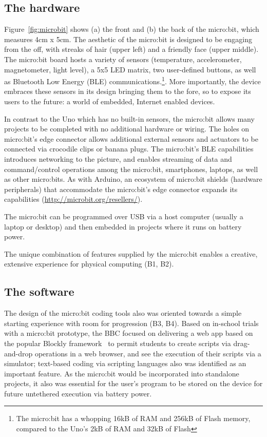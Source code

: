 \subsection{The hardware}

Figure~\ref{fig:microbit} shows (a) the front and (b) the back of the
micro:bit, which measures 4cm x 5cm. The aesthetic of the micro:bit is designed to be engaging from the off, with streaks of hair (upper left) and a friendly face (upper middle).
The micro:bit board hosts a variety of sensors (temperature, accelerometer, magnetometer,
light level), a 5x5 LED matrix, two user-defined buttons, as well as Bluetooth
Low Energy (BLE) communications.\footnote{The micro:bit has a whopping
16kB of RAM and 256kB of Flash memory, compared to the Uno's 2kB of
RAM and 32kB of Flash}. More importantly, the device embraces these sensors in its design bringing them to the fore, so to expose its users to the future: a world of embedded, Internet enabled devices.

In contrast to the Uno which has no built-in sensors, the micro:bit
allows many projects to be completed with no additional hardware or wiring.
The holes on micro:bit's edge connector allows additional external sensors and actuators to be connected via crocodile clips or banana plugs.
The micro:bit's BLE capabilities introduces networking to the
picture, and enables streaming of data and command/control operations among the micro:bit,
smartphones, laptops, as well as other micro:bits.
As with Arduino, an ecosystem of micro:bit shields
(hardware peripherals) that accommodate the micro:bit's edge
connector expands its capabilities (\url{http://microbit.org/resellers/}).

The micro:bit can be programmed over USB via a host computer (usually a laptop or desktop)
and then embedded in projects where it runs on battery power.

The unique combination of features supplied by the micro:bit enables a creative, extensive experience for physical computing (B1, B2).

\subsection{The software}

The design of the micro:bit coding tools also was oriented towards a
simple starting experience with room for progression (B3, B4). Based on in-school trials with a micro:bit prototype, the BBC focused on delivering a web app
based on the popular Blockly framework~\cite{Blocky2015} to permit students to
create scripts via drag-and-drop operations in a web browser, and see
the execution of their scripts via a simulator; text-based coding via scripting languages also
was identified as an important feature. As the micro:bit would be incorporated
into standalone projects, it also was essential for the user's program to be stored on the device for future untethered execution via battery power.

